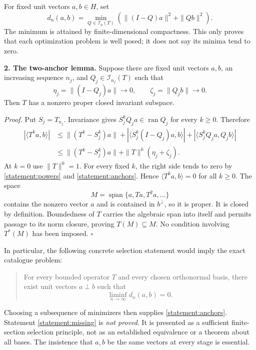 \documentclass[11pt,a4paper]{article}
\numberwithin{equation}{section}
\begin{document}
For fixed unit vectors $a,b\in H$, set
\begin{equation}\label{statement:objective}
 d_n(a,b)=\min_{Q\in\mathcal I_n(T)}
 \left(\|(I-Q)a\|^2+\|Qb\|^2\right).
\end{equation}
The minimum is attained by finite-dimensional compactness. This only proves
that each optimization problem is well posed; it does not say its minima
tend to zero.

\medskip
\textbf{2. The two-anchor lemma.}
Suppose there are fixed unit vectors $a,b$, an increasing sequence $n_j$, and
$Q_j\in\mathcal I_{n_j}(T)$ such that
\begin{equation}\label{statement:anchors}
 \eta_j=\|(I-Q_j)a\|\longrightarrow0,
 \qquad \zeta_j=\|Q_jb\|\longrightarrow0.
\end{equation}
Then $T$ has a nonzero proper closed invariant subspace.

\emph{Proof.} Put $S_j=T_{n_j}$. Invariance gives
$S_j^kQ_ja\in\operatorname{ran}Q_j$ for every $k\geq0$. Therefore
\begin{align}
 |\langle T^ka,b\rangle|
 &\leq \|(T^k-S_j^k)a\|
       +|\langle S_j^k(I-Q_j)a,b\rangle|
       +|\langle S_j^kQ_ja,Q_jb\rangle|\nonumber\\
 &\leq\|(T^k-S_j^k)a\|+\|T\|^k(\eta_j+\zeta_j).
 \label{statement:anchor-estimate}
\end{align}
At $k=0$ use $\|T\|^0=1$. For every fixed $k$, the right side tends to zero
by \eqref{statement:powers} and \eqref{statement:anchors}. Hence
$\langle T^ka,b\rangle=0$ for all $k\geq0$. The space
\begin{equation}\label{statement:cyclic-space}
 M=\overline{\operatorname{span}}\{a,Ta,T^2a,\ldots\}
\end{equation}
contains the nonzero vector $a$ and is contained in $b^\perp$, so it is
proper. It is closed by definition. Boundedness of $T$ carries the algebraic
span into itself and permits passage to its norm closure, proving
$T(M)\subseteq M$. No condition involving $T^*(M)$ has been imposed.
$\square$

In particular, the following concrete selection statement would imply the
exact catalogue problem:
\begin{quote}
For every bounded operator $T$ and every chosen orthonormal basis, there
exist unit vectors $a\perp b$ such that
\begin{equation}\label{statement:missing}
 \liminf_{n\to\infty}d_n(a,b)=0.
\end{equation}
\end{quote}
Choosing a subsequence of minimizers then supplies \eqref{statement:anchors}.
Statement \eqref{statement:missing} is \emph{not proved}. It is presented as a
sufficient finite-section selection principle, not as an established
equivalence or a theorem about all bases. The insistence that $a,b$ be the
same vectors at every stage is essential.
\end{document}
